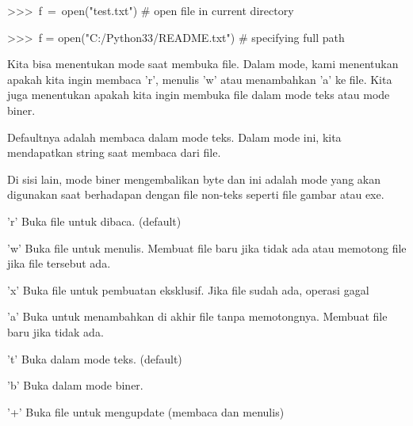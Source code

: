 \vspace{12pt}
>>>~f~=~open("test.txt")     $  \#  $ open file in current directory \par
>>>~f = open("C:/Python33/README.txt")   $  \#  $ specifying full path \par
\vspace{12pt}
Kita bisa menentukan mode saat membuka file. Dalam mode, kami menentukan apakah kita ingin membaca 'r', menulis 'w' atau menambahkan 'a' ke file. Kita juga menentukan apakah kita ingin membuka file dalam mode teks atau mode biner. \par
\vspace{12pt}
Defaultnya adalah membaca dalam mode teks. Dalam mode ini, kita mendapatkan string saat membaca dari file. \par
\vspace{12pt}
Di sisi lain, mode biner mengembalikan byte dan ini adalah mode yang akan digunakan saat berhadapan dengan file non-teks seperti file gambar atau exe. \par
\vspace{12pt}
'r' \hspace*{0.5in} Buka file untuk dibaca. (default) \par
\vspace{12pt}
'w' \hspace*{0.5in} Buka file untuk menulis. Membuat file baru jika tidak ada atau memotong file jika file tersebut ada. \par
\vspace{12pt}
'x' \hspace*{0.5in} Buka file untuk pembuatan eksklusif. Jika file sudah ada, operasi gagal \par
\vspace{12pt}
'a' \hspace*{0.5in} Buka untuk menambahkan di akhir file tanpa memotongnya. Membuat file baru jika tidak ada. \par
\vspace{12pt}
't' \hspace*{0.5in} Buka dalam mode teks. (default) \par
\vspace{12pt}
'b' \hspace*{0.5in} Buka dalam mode biner. \par
\vspace{12pt}
'+' \hspace*{0.5in} Buka file untuk mengupdate (membaca dan menulis) \par
\vspace{12pt}
